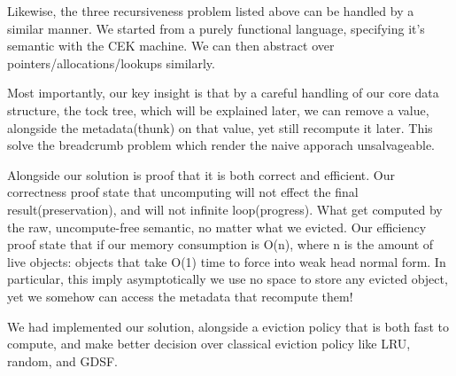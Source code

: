 Likewise, the three recursiveness problem listed above can be handled by a similar manner. We started from a purely functional language, specifying it's semantic with the CEK machine. We can then abstract over pointers/allocations/lookups similarly.

Most importantly, our key insight is that by a careful handling of our core data structure, the tock tree, which will be explained later, we can remove a value, alongside the metadata(thunk) on that value, yet still recompute it later. This solve the breadcrumb problem which render the naive apporach unsalvageable.

Alongside our solution is proof that it is both correct and efficient. Our correctness proof state that uncomputing will not effect the final result(preservation), and will not infinite loop(progress). What get computed by the raw, uncompute-free semantic, no matter what we evicted. Our efficiency proof state that if our memory consumption is O(n), where n is the amount of live objects: objects that take O(1) time to force into weak head normal form. In particular, this imply asymptotically we use no space to store any evicted object, yet we somehow can access the metadata that recompute them!

We had implemented our solution, alongside a eviction policy that is both fast to compute, and make better decision over classical eviction policy like LRU, random, and GDSF.